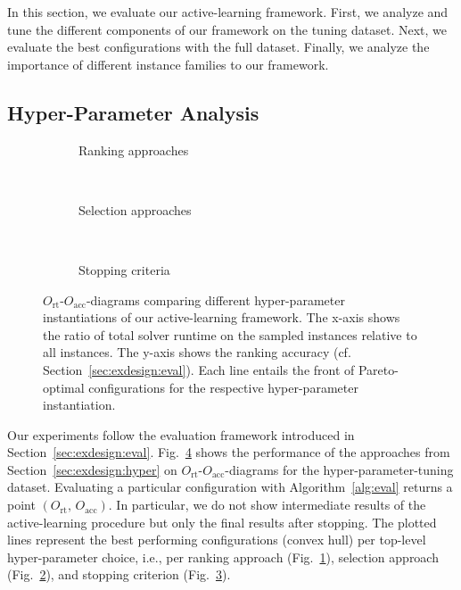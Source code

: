 \documentclass[runningheads]{llncs}
\begin{document}
In this section, we evaluate our active-learning framework.
First, we analyze and tune the different components of our framework on the tuning dataset.
Next, we evaluate the best configurations with the full dataset.
Finally, we analyze the importance of different instance families to our framework.

\subsection{Hyper-Parameter Analysis}

\begin{figure}[tbp!]
  \centering
  \begin{subfigure}{1.0\textwidth}
    \caption{Ranking approaches}
    \label{fig:annitraincolorranking}
  \end{subfigure}
  \\
  \vspace{0.2cm}
  \begin{subfigure}{1.0\textwidth}
    \caption{Selection approaches}
    \label{fig:annitraincolorselection}
  \end{subfigure}
  \\
  \vspace{0.2cm}
  \begin{subfigure}{1.0\textwidth}
    \caption{Stopping criteria}
    \label{fig:annitraincolorstopping}
  \end{subfigure}
  \caption{
    $O_{\operatorname{rt}}$-$O_{\operatorname{acc}}$-diagrams comparing different hyper-parameter instantiations of our active-learning framework.
    The x-axis shows the ratio of total solver runtime on the sampled instances relative to all instances.
    The y-axis shows the ranking accuracy (cf. Section~\ref{sec:exdesign:eval}).
    Each line entails the front of Pareto-optimal configurations for the respective hyper-parameter instantiation.
  }
  \label{fig:e2eallsolvers}
\end{figure}

Our experiments follow the evaluation framework introduced in Section~\ref{sec:exdesign:eval}.
Fig.~\ref{fig:e2eallsolvers} shows the performance of the approaches from Section~\ref{sec:exdesign:hyper} on $O_{\operatorname{rt}}$-$O_{\operatorname{acc}}$-diagrams for the hyper-parameter-tuning dataset.
Evaluating a particular configuration with Algorithm~\ref{alg:eval} returns a point $\left(O_{\operatorname{rt}},\, O_{\operatorname{acc}}\right)$.
In particular, we do not show intermediate results of the active-learning procedure but only the final results after stopping.
The plotted lines represent the best performing configurations (convex hull) per top-level hyper-parameter choice, i.e., per ranking approach (Fig.~\ref{fig:annitraincolorranking}), selection approach (Fig.~\ref{fig:annitraincolorselection}), and stopping criterion (Fig.~\ref{fig:annitraincolorstopping}).
\end{document}
